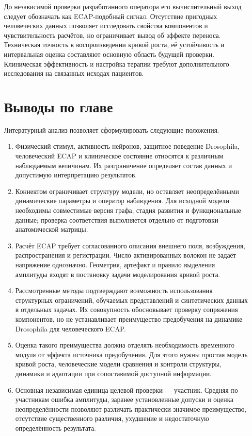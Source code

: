 До независимой проверки разработанного оператора его вычислительный выход следует обозначать как ECAP-подобный сигнал. Отсутствие пригодных человеческих данных позволяет исследовать свойства компонентов и чувствительность расчётов, но ограничивает вывод об эффекте переноса. Техническая точность в воспроизведении кривой роста, её устойчивость и интервальная оценка составляют основную область будущей проверки. Клиническая эффективность и настройка терапии требуют дополнительного исследования на связанных исходах пациентов.

\section*{Выводы по главе}

Литературный анализ позволяет сформулировать следующие положения.
\begin{enumerate}
\item Физический стимул, активность нейронов, защитное поведение Drosophila, человеческий ECAP и клиническое состояние относятся к различным наблюдаемым величинам. Их разграничение определяет состав данных и допустимую интерпретацию результатов.
\item Коннектом ограничивает структуру модели, но оставляет неопределёнными динамические параметры и оператор наблюдения. Для исходной модели необходимы совместимые версия графа, стадия развития и функциональные данные; проверка соответствия выполняется отдельно от подготовки анатомической матрицы.
\item Расчёт ECAP требует согласованного описания внешнего поля, возбуждения, распространения и регистрации. Число активированных волокон не задаёт напряжение однозначно. Геометрия, артефакт и правило выделения амплитуды входят в постановку задачи моделирования кривой роста.
\item Рассмотренные методы подтверждают возможность использования структурных ограничений, обучаемых представлений и синтетических данных в отдельных задачах. Их совокупность обосновывает проверку сопряжения компонентов, но не устанавливает преимущество предобучения на динамике Drosophila для человеческого ECAP.
\item Оценка такого преимущества должна отделять необходимость временного модуля от эффекта источника предобучения. Для этого нужны простая модель кривой роста, человеческие модели сравнения и контроли структуры, динамики и адаптации при сопоставимой доступной информации.
\item Основная независимая единица целевой проверки --- участник. Средняя по участникам ошибка амплитуды, заранее установленные допуски и оценка неопределённости позволяют различать практически значимое преимущество, отсутствие существенного различия, ухудшение и недостаточную определённость результата.
\end{enumerate}

